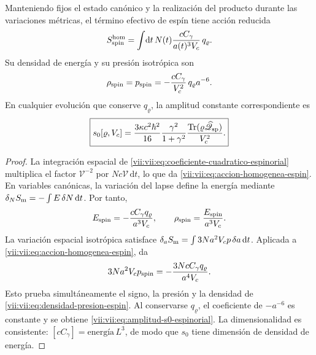 \begin{theorem}
\label{vii:vii:thm:amplitud-material-explicita}
Manteniendo fijos el estado canónico y la realización del producto
durante las variaciones métricas, el término efectivo de espín tiene
acción reducida
\begin{equation}
 S_{\rm spin}^{\rm hom}
 =\int\!\mathrm dt\,N(t)
       \frac{cC_\gamma}{a(t)^3V_c}\,q_\varrho.
 \label{vii:vii:eq:accion-homogenea-espin}
\end{equation}
Su densidad de energía y su presión isotrópica son
\begin{equation}
 \rho_{\rm spin}=p_{\rm spin}
 =-\frac{cC_\gamma}{V_c^2}\,q_\varrho a^{-6}.
 \label{vii:vii:eq:densidad-presion-espin}
\end{equation}
En cualquier evolución que conserve \(q_\varrho\), la amplitud
constante correspondiente es
\begin{equation}
 \boxed{\displaystyle
 s_0[\varrho,V_c]
 =\frac{3\kappa c^2\hbar^2}{16}
    \frac{\gamma^2}{1+\gamma^2}
    \frac{\operatorname{Tr}
       (\varrho\widehat{\mathscr Q}_{\rm sp})}{V_c^2}.}
 \label{vii:vii:eq:amplitud-s0-espinorial}
\end{equation}
\end{theorem}
\begin{proof}
La integración espacial de
\eqref{vii:vii:eq:coeficiente-cuadratico-espinorial} multiplica el
factor \(\mathcal V^{-2}\) por
\(Nc\mathcal V\,\mathrm dt\), lo que da
\eqref{vii:vii:eq:accion-homogenea-espin}. En variables canónicas,
la variación del lapse define la energía mediante
\(\delta_N S_{\rm m}=-\int E\,\delta N\,\mathrm dt\).
Por tanto,
\[
 E_{\rm spin}=-\frac{cC_\gamma q_\varrho}{a^3V_c},
 \qquad \rho_{\rm spin}=\frac{E_{\rm spin}}{a^3V_c}.
\]
La variación espacial isotrópica satisface
\(\delta_a S_{\rm m}=\int3Na^2V_c p\,\delta a\,\mathrm dt\).
Aplicada a \eqref{vii:vii:eq:accion-homogenea-espin}, da
\[
 3Na^2V_c p_{\rm spin}
 =-\frac{3NcC_\gamma q_\varrho}{a^4V_c}.
\]
Esto prueba simultáneamente el signo, la presión y la densidad de
\eqref{vii:vii:eq:densidad-presion-espin}. Al conservarse
\(q_\varrho\), el coeficiente de \(-a^{-6}\) es constante y
se obtiene \eqref{vii:vii:eq:amplitud-s0-espinorial}. La dimensionalidad
es consistente: \([cC_\gamma]=\text{energía}\,L^3\),
de modo que \(s_0\) tiene dimensión de densidad de energía.
\end{proof}

